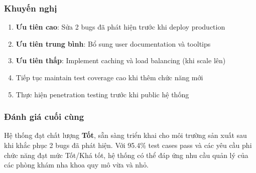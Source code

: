\subsubsection{Khuyến nghị}

\begin{enumerate}
    \item \textbf{Ưu tiên cao}: Sửa 2 bugs đã phát hiện trước khi deploy production
    \item \textbf{Ưu tiên trung bình}: Bổ sung user documentation và tooltips
    \item \textbf{Ưu tiên thấp}: Implement caching và load balancing (khi scale lên)
    \item Tiếp tục maintain test coverage cao khi thêm chức năng mới
    \item Thực hiện penetration testing trước khi public hệ thống
\end{enumerate}

\subsubsection{Đánh giá cuối cùng}

Hệ thống đạt chất lượng \textbf{Tốt}, sẵn sàng triển khai cho môi trường sản xuất sau khi khắc phục 2 bugs đã phát hiện. Với 95.4\% test cases pass và các yêu cầu phi chức năng đạt mức Tốt/Khá tốt, hệ thống có thể đáp ứng nhu cầu quản lý của các phòng khám nha khoa quy mô vừa và nhỏ.
